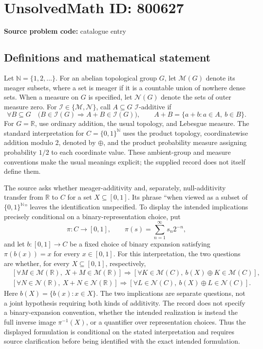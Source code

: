 \documentclass[11pt]{article}
\begin{document}
\section*{UnsolvedMath ID: 800627}
\textbf{Source problem code:} catalogue entry
\subsection{Definitions and mathematical statement}
Let \(\mathbb N=\{1,2,\ldots\}\). For an abelian topological group \(G\), let \(\mathcal M(G)\) denote its meager subsets, where a set is meager if it is a countable union of nowhere dense sets. When a measure on \(G\) is specified, let \(\mathcal N(G)\) denote the sets of outer measure zero. For \(\mathcal I\in\{\mathcal M,\mathcal N\}\), call \(A\subseteq G\) \(\mathcal I\)-additive if
\[
\forall B\subseteq G\quad
\bigl(B\in\mathcal I(G)\Longrightarrow A+B\in\mathcal I(G)\bigr),
\qquad A+B=\{a+b:a\in A,\ b\in B\}.
\]
For \(G=\mathbb R\), use ordinary addition, the usual topology, and Lebesgue measure. The standard interpretation for \(C=\{0,1\}^{\mathbb N}\) uses the product topology, coordinatewise addition modulo \(2\), denoted by \(\oplus\), and the product probability measure assigning probability \(1/2\) to each coordinate value. These ambient-group and measure conventions make the usual meanings explicit; the supplied record does not itself define them.

The source asks whether meager-additivity and, separately, null-additivity transfer from \(\mathbb R\) to \(C\) for a set \(X\subseteq[0,1]\). Its phrase ``when viewed as a subset of \(\{0,1\}^{\mathbb N}\)'' leaves the identification unspecified. To display the intended implications precisely conditional on a binary-representation choice, put
\[
\pi:C\longrightarrow[0,1],\qquad
\pi(s)=\sum_{n=1}^{\infty}s_n2^{-n},
\]
and let \(b:[0,1]\longrightarrow C\) be a fixed choice of binary expansion satisfying \(\pi(b(x))=x\) for every \(x\in[0,1]\). For this interpretation, the two questions are whether, for every \(X\subseteq[0,1]\), respectively,
\[
\begin{aligned}
&\left[\forall M\in\mathcal M(\mathbb R),\ X+M\in\mathcal M(\mathbb R)\right]
\Longrightarrow
\left[\forall K\in\mathcal M(C),\ b(X)\oplus K\in\mathcal M(C)\right],\\
&\left[\forall N\in\mathcal N(\mathbb R),\ X+N\in\mathcal N(\mathbb R)\right]
\Longrightarrow
\left[\forall L\in\mathcal N(C),\ b(X)\oplus L\in\mathcal N(C)\right].
\end{aligned}
\]
Here \(b(X)=\{b(x):x\in X\}\). The two implications are separate questions, not a joint hypothesis requiring both kinds of additivity. The record does not specify a binary-expansion convention, whether the intended realization is instead the full inverse image \(\pi^{-1}(X)\), or a quantifier over representation choices. Thus the displayed formulation is conditional on the stated interpretation and requires source clarification before being identified with the exact intended formulation.
\end{document}
